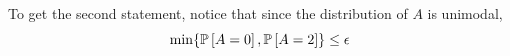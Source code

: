 To get the second statement, notice that since the distribution of $A$ is unimodal, $$\min\{{\mathbb{P}}\left[A=0\right], {\mathbb{P}}\left[A=2\right]\} \le {\epsilon}$$



%








